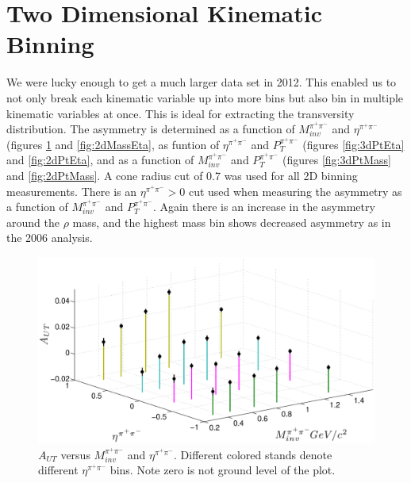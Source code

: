 \documentclass[abstract = on,listof=totoc, bibliography=totoc]{scrreprt}
\newcommand{\ptpair}{P_{T}^{\pi^+\pi^-}}
\newcommand{\mpair}{M_{inv}^{\pi^+\pi^-}}
\newcommand{\etapair}{\eta^{\pi^+\pi^-}}
\begin{document}
\section{Two Dimensional Kinematic Binning}
\label{sec:2dresults}

We were lucky enough to get a much larger data set in 2012. This enabled us to not only break each kinematic variable up into more bins but also bin in multiple kinematic variables at once. This is ideal for extracting the transversity distribution. The asymmetry is determined as a function of $\mpair$ and $\etapair$ (figures \ref{fig:3dmassEta} and \ref{fig:2dMassEta}, as funtion of $\etapair$ and $\ptpair$ (figures \ref{fig:3dPtEta} and \ref{fig:2dPtEta}, and as a function of $\mpair$ and $\ptpair$ (figures \ref{fig:3dPtMass} and \ref{fig:2dPtMass}. A cone radius cut of 0.7 was used for all 2D binning measurements. There is an $\etapair > 0$ cut used when measuring the asymmetry as a function of $\mpair$ and $\ptpair$. Again there is an increase in the asymmetry around the $\rho$ mass, and the highest mass bin shows decreased asymmetry as in the 2006 analysis.  




\begin{figure}
\begin{center}
\includegraphics[width = 1\textwidth]{massEta3d82415}
\caption[Asymmetry vs $\etapair$ and $\mpair$ 2D binning]{$A_{UT}$ versus $\mpair$ and $\etapair$. Different colored stands denote different $\etapair$ bins. Note zero is not ground level of the plot.}
\label{fig:3dmassEta}
\end{center}
\end{figure}
\end{document}
